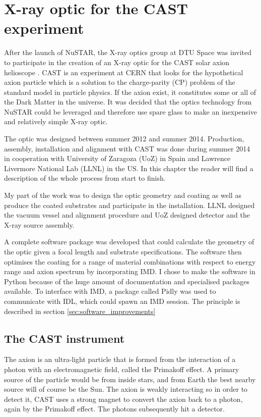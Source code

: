 \chapter{X-ray optic for the CAST experiment}\label{chap:cast_xrt}
After the launch of NuSTAR, the X-ray optics group at DTU Space was invited to participate in the creation of an X-ray optic for the CAST solar axion helioscope \cite{Elias:1387488,Iguaz:1389411}. CAST is an experiment at CERN that looks for the hypothetical axion particle\cite{Weinberg:1978ii,Wilczek:1978kp,Peccei:1977ea,Peccei:1977em} which is a solution to the charge-parity (CP) problem of the standard model in particle physics\cite{Cheng:1988fu}. If the axion exist, it constitutes some or all of the Dark Matter in the universe\cite{Visinelli:2011tw,Bae:2008ix}. It was decided that the optics technology from NuSTAR\cite{Christensen:2011wg,Harrison:2010gu,Koglin:2005kb,Zhang:2009cb,Harrison:2013wl} could be leveraged and therefore use spare glass to make an inexpensive and relatively simple X-ray optic.

The optic was designed between summer 2012 and summer 2014. Production, assembly, installation and alignment with CAST was done during summer 2014 in cooperation with University of Zaragoza (UoZ) in Spain and Lawrence Livermore National Lab (LLNL) in the US. In this chapter the reader will find a description of the whole process from start to finish.

My part of the work was to design the optic geometry and coating as well as produce the coated substrates and participate in the installation. LLNL designed the vacuum vessel and alignment procedure and UoZ designed detector and the X-ray source assembly.

A complete software package was developed that could calculate the geometry of the optic given a focal length and substrate specifications. The software then optimises the coating for a range of material combinations with respect to energy range and axion spectrum by incorporating IMD. I chose to make the software in Python because of the huge amount of documentation and specialised packages available. To interface with IMD, a package called Pidly was used to communicate with IDL, which could spawn an IMD session. The principle is described in section \ref{sec:software_improvements}

\section{The CAST instrument}
The axion is an ultra-light particle that is formed from the interaction of a photon with an electromagnetic field, called the Primakoff effect. A primary source of the particle would be from inside stars, and from Earth the best nearby source will of course be the Sun. The axion is weakly interacting so in order to detect it, CAST uses a strong magnet to convert the axion back to a photon, again by the Primakoff effect. The photons subsequently hit a detector.

